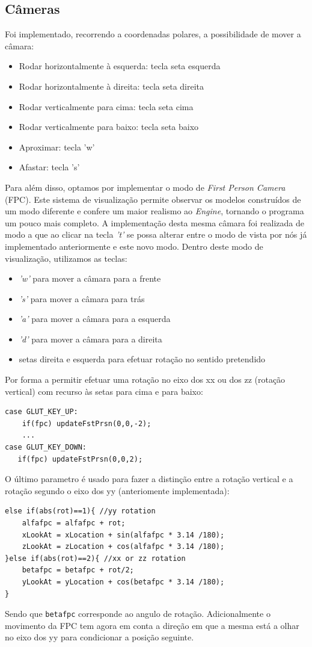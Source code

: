 \documentclass{article}
\begin{document}
\subsection{Câmeras}
Foi implementado, recorrendo a coordenadas polares, a possibilidade de mover a câmara:
\begin{itemize}
    \item Rodar horizontalmente à esquerda: tecla seta esquerda
    \item Rodar horizontalmente à direita: tecla seta direita
    \item Rodar verticalmente para cima: tecla seta cima
    \item Rodar verticalmente para baixo: tecla seta baixo
    \item Aproximar: tecla 'w'
    \item Afastar: tecla 's'
\end{itemize}

Para além disso, optamos por implementar o modo de \textit{First Person Camera} (FPC). Este sistema de visualização permite observar os modelos construídos de um modo diferente e confere um maior realismo ao \textit{Engine}, tornando o programa um pouco mais completo. A implementação desta mesma câmara foi realizada de modo a que ao clicar na tecla \textit{'t'} se possa alterar entre o modo de vista por nós já implementado anteriormente e este novo modo.
\newline
Dentro deste modo de visualização, utilizamos as teclas:
\begin{itemize}
    \item \textit{'w'} para mover a câmara para a frente
    \item \textit{'s'} para mover a câmara para trás
    \item \textit{'a'} para mover a câmara para a esquerda
    \item \textit{'d'} para mover a câmara para a direita
    \item setas direita e esquerda para efetuar rotação no sentido pretendido
\end{itemize}

Por forma a permitir efetuar uma rotação no eixo dos xx ou dos zz (rotação vertical) com recurso às setas para cima e para baixo:
\begin{verbatim}
case GLUT_KEY_UP:
    if(fpc) updateFstPrsn(0,0,-2);
    ...
case GLUT_KEY_DOWN:
   if(fpc) updateFstPrsn(0,0,2);
\end{verbatim}

O último parametro é usado para fazer a distinção entre a rotação vertical e a rotação segundo o eixo dos yy (anteriomente implementada):
\begin{verbatim}
else if(abs(rot)==1){ //yy rotation 
    alfafpc = alfafpc + rot;
    xLookAt = xLocation + sin(alfafpc * 3.14 /180);
    zLookAt = zLocation + cos(alfafpc * 3.14 /180);
}else if(abs(rot)==2){ //xx or zz rotation 
    betafpc = betafpc + rot/2;
    yLookAt = yLocation + cos(betafpc * 3.14 /180);
}
\end{verbatim}
Sendo que \texttt{betafpc} corresponde ao angulo de rotação. Adicionalmente o movimento da FPC tem agora em conta a direção em que a mesma está a olhar no eixo dos yy para condicionar a posição seguinte.
\end{document}
